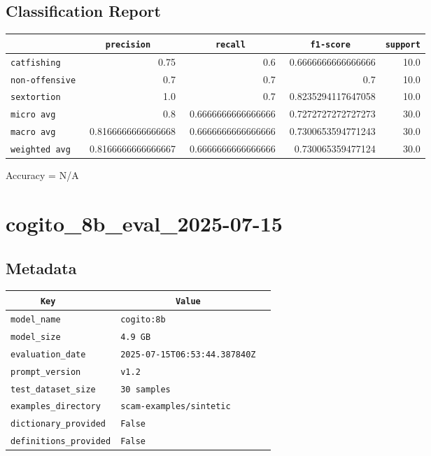 \documentclass{article}
\begin{document}
\subsection{Classification Report}

\begin{center}
\begin{tabular}{l | r | r | r | r} \hline
    \verb|            | & \verb|    precision     | & \verb|      recall      | & \verb|     f1-score     | & \verb|support| \\ \hline
    \hline
    \verb|catfishing | & 0.75 & 0.6 & 0.6666666666666666 &    10.0 \\ \hline
    \verb|non-offensive| & 0.7 & 0.7 & 0.7 &    10.0 \\ \hline
    \verb|sextortion | & 1.0 & 0.7 & 0.8235294117647058 &    10.0 \\ \hline
    \verb|micro avg  | & 0.8 & 0.6666666666666666 & 0.7272727272727273 &    30.0 \\ \hline
    \verb|macro avg  | & 0.8166666666666668 & 0.6666666666666666 & 0.7300653594771243 &    30.0 \\ \hline
    \verb|weighted avg| & 0.8166666666666667 & 0.6666666666666666 & 0.730065359477124 &    30.0 \\ \hline
\end{tabular}
\end{center}

\begin{center}
Accuracy = N/A
\end{center}

\section{cogito\_8b\_eval\_2025-07-15}
\subsection{Metadata}

\begin{center}
\begin{tabular}{l | l} \hline
    \verb|      Key      | & \verb|           Value           | \\ \hline
    \hline
    \verb|model_name    | & \verb|cogito:8b                    | \\ \hline
    \verb|model_size    | & \verb|4.9 GB                       | \\ \hline
    \verb|evaluation_date| & \verb|2025-07-15T06:53:44.387840Z  | \\ \hline
    \verb|prompt_version| & \verb|v1.2                         | \\ \hline
    \verb|test_dataset_size| & \verb|30 samples                   | \\ \hline
    \verb|examples_directory| & \verb|scam-examples/sintetic       | \\ \hline
    \verb|dictionary_provided| & \verb|False                        | \\ \hline
    \verb|definitions_provided| & \verb|False                        | \\ \hline
\end{tabular}
\end{center}
\end{document}
